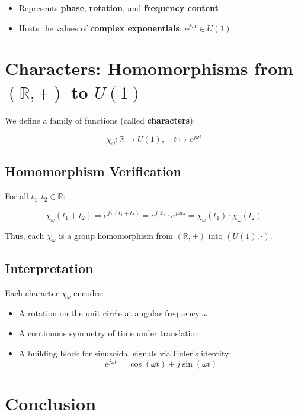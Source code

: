 \documentclass[12pt]{article}
\begin{document}
	\begin{itemize}[leftmargin=1.5em]
		\item Represents \textbf{phase}, \textbf{rotation}, and \textbf{frequency content}
		\item Hosts the values of \textbf{complex exponentials}: \(e^{j \omega t} \in U(1)\)
	\end{itemize}
	
	\section{Characters: Homomorphisms from \((\mathbb{R}, +)\) to \(U(1)\)}
	
	We define a family of functions (called \textbf{characters}):
	
	\[
	\chi_\omega\colon \mathbb{R} \to U(1), \quad t \mapsto e^{j \omega t}
	\]
	
	\subsection*{Homomorphism Verification}
	
	For all \(t_1, t_2 \in \mathbb{R}\):
	
	\[
	\chi_\omega(t_1 + t_2) = e^{j \omega (t_1 + t_2)} = e^{j \omega t_1} \cdot e^{j \omega t_2} = \chi_\omega(t_1) \cdot \chi_\omega(t_2)
	\]
	
	Thus, each \(\chi_\omega\) is a group homomorphism from \((\mathbb{R}, +)\) into \((U(1), \cdot)\).
	
	\subsection*{Interpretation}
	
	Each character \(\chi_\omega\) encodes:
	
	\begin{itemize}[leftmargin=1.5em]
		\item A rotation on the unit circle at angular frequency \(\omega\)
		\item A continuous symmetry of time under translation
		\item A building block for sinusoidal signals via Euler's identity:
		\[
		e^{j \omega t} = \cos(\omega t) + j \sin(\omega t)
		\]
	\end{itemize}
	
	\section*{Conclusion}
	
\end{document}
